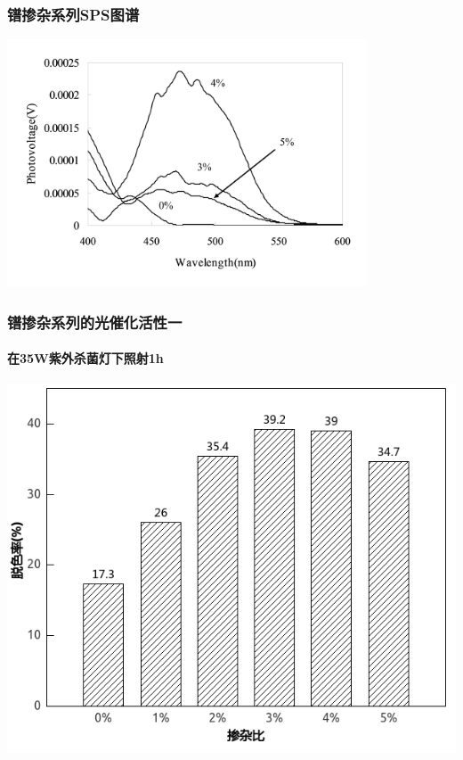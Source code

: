 \documentclass[xetex,compress]{mybeamer}
\begin{document}
\begin{frame}
\frametitle{镨掺杂系列SPS图谱}
\begin{block}{}
\centering
\includegraphics[width=0.8\textwidth]{figures/镨掺杂SPS.jpg} 
\end{block}
\end{frame}


\begin{frame}
\frametitle{镨掺杂系列的光催化活性一}
\framesubtitle{在35W紫外杀菌灯下照射1h}
\begin{block}{}
\centering
\includegraphics[scale=6]{figures/镨掺杂活性1.jpg} 
\end{block}
\end{frame}
\end{document}
